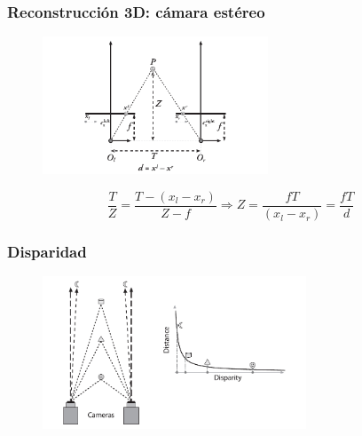 \begin{frame}
	\frametitle{Reconstrucción 3D: cámara estéreo}
	
	
	\begin{figure}[!h]
		\includegraphics[width=0.6\textwidth]{images/stereo_triangulation2.png}
	\end{figure}
	
	\begin{equation*}
		\frac{T}{Z} = \frac{T - (x_l - x_r)}{Z-f} \Rightarrow Z = \frac{fT}{(x_l - x_r)}  = \frac{fT}{d}
	\end{equation*}
	
\end{frame}

\begin{frame}
	\frametitle{Disparidad}
	
	\begin{figure}[!h]
		\includegraphics[width=0.7\textwidth]{images/disparity.png}
	\end{figure}

\end{frame}


